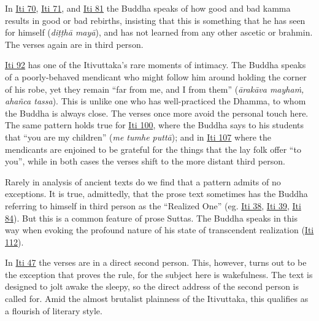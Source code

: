 \documentclass[12pt,openany]{book}%
\begin{document}
In \href{https://suttacentral.net/iti70/en/sujato}{Iti 70}, \href{https://suttacentral.net/iti71/en/sujato}{Iti 71}, and \href{https://suttacentral.net/iti81/en/sujato}{Iti 81} the Buddha speaks of how good and bad kamma results in good or bad rebirths, insisting that this is something that he has seen for himself (\emph{\textsanskrit{diṭṭhā} \textsanskrit{mayā}}), and has not learned from any other ascetic or brahmin. The verses again are in third person.

\href{https://suttacentral.net/iti92/en/sujato}{Iti 92} has one of the Itivuttaka’s rare moments of intimacy. The Buddha speaks of a poorly-behaved mendicant who might follow him around holding the corner of his robe, yet they remain “far from me, and I from them” (\emph{\textsanskrit{ārakāva} \textsanskrit{mayhaṁ}, \textsanskrit{ahañca} tassa}). This is unlike one who has well-practiced the Dhamma, to whom the Buddha is always close. The verses once more avoid the personal touch here. The same pattern holds true for \href{https://suttacentral.net/iti100/en/sujato}{Iti 100}, where the Buddha says to his students that “you are my children” (\emph{me tumhe \textsanskrit{puttā}}); and in \href{https://suttacentral.net/iti107/en/sujato}{Iti 107} where the mendicants are enjoined to be grateful for the things that the lay folk offer “to you”, while in both cases the verses shift to the more distant third person.

Rarely in analysis of ancient texts do we find that a pattern admits of no exceptions. It is true, admittedly, that the prose text sometimes has the Buddha referring to himself in third person as the “Realized One” (eg. \href{https://suttacentral.net/iti38/en/sujato}{Iti 38}, \href{https://suttacentral.net/iti39/en/sujato}{Iti 39}, \href{https://suttacentral.net/iti84/en/sujato}{Iti 84}). But this is a common feature of prose Suttas. The Buddha speaks in this way when evoking the profound nature of his state of transcendent realization (\href{https://suttacentral.net/iti112/en/sujato}{Iti 112}).

In \href{https://suttacentral.net/iti47/en/sujato}{Iti 47} the verses are in a direct second person. This, however, turns out to be the exception that proves the rule, for the subject here is wakefulness. The text is designed to jolt awake the sleepy, so the direct address of the second person is called for. Amid the almost brutalist plainness of the Itivuttaka, this qualifies as a flourish of literary style.
\end{document}
